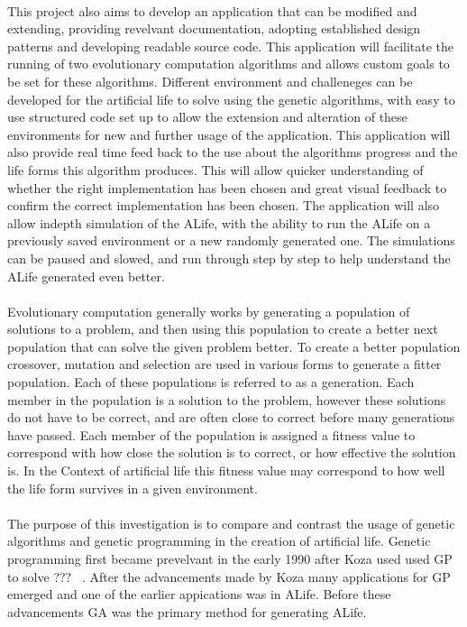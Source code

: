 \documentclass[12pt]{article}
\begin{document}
\paragraph{}
This project also aims to develop an application that can be modified and extending, providing revelvant documentation, adopting established design
patterns and developing readable source code. This application will facilitate the running of two evolutionary computation algorithms and allows
custom goals to be set for these algorithms. Different environment and challeneges can be developed for the artificial life to solve using the 
genetic algorithms, with easy to use structured code set up to allow the extension and alteration of these environments for new and further
usage of the application. This application will also provide real time feed back to the use about the algorithms progress and the life forms
this algorithm produces. This will allow quicker understanding of whether the right implementation has been chosen and great visual feedback
to confirm the correct implementation has been chosen. The application will also allow indepth simulation of the ALife, with the ability to 
run the ALife on a previously saved environment or a new randomly generated one. The simulations can be paused and slowed, and run through 
step by step to help understand the ALife generated even better. 


\paragraph{}
Evolutionary computation generally works by generating a population of solutions to a problem, and then using this population to create a better next population that can solve the given problem better.
To create a better population crossover, mutation and selection are used in various forms to generate a fitter population.
Each of these populations is referred to as a generation.
Each member in the population is a solution to the problem, however these solutions do not have to be correct, and are often close to correct before many generations have passed.
Each member of the population is assigned a fitness value to correspond with how close the solution is to correct, or how effective the solution is.
In the Context of artificial life this fitness value may correspond to how well the life form survives in a given environment.

\paragraph{}
The purpose of this investigation is to compare and contrast the usage of genetic algorithms and genetic programming in the creation of artificial life. Genetic programming first became prevelvant in the early 1990 after Koza used used GP to solve ??? ~\cite{Koza90}. After the advancements made by Koza many applications for GP emerged and one of the earlier appications was in ALife. Before these advancements GA was the primary method for generating ALife.
\end{document}
